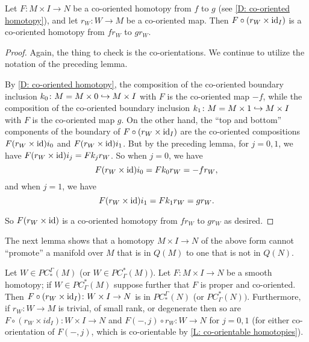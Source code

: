 \begin{corollary}\label{C: universal homotopy boundary co-orientation}
	Let $F \colon M \times I \to N$ be a co-oriented homotopy from $f$ to $g$ (see \cref{D: co-oriented homotopy}), and let $r_W \colon W \to M$ be a co-oriented map.
	Then $F \circ (r_W \times \mathrm{id}_I)$ is a co-oriented homotopy from $fr_W$ to $gr_W$.
\end{corollary}

\begin{proof}
	Again, the thing to check is the co-orientations. We continue to utilize the notation of the preceding lemma.

	By \cref{D: co-oriented homotopy}, the composition of the co-oriented boundary inclusion $k_0 \colon M = M \times 0 \hookrightarrow M \times I$ with $F$ is the co-oriented map $-f$, while the composition of the co-oriented boundary inclusion $k_1 \colon M = M \times 1 \hookrightarrow M \times I$ with $F$ is the co-oriented map
	$g$. On the other hand, the ``top and bottom'' components of the boundary of $F \circ (r_W \times \mathrm{id}_I)$ are the co-oriented compositions $F (r_W\times \mathrm{id}) i_0$ and $F (r_W\times \mathrm{id}) i_1$.
	But by the preceding lemma, for $j=0,1$, we have $F (r_W\times \mathrm{id}) i_j = F k_j r_W$.
	So when $j=0$, we have
	$$ F (r_W\times \mathrm{id}) i_0 = F k_0 r_W = -f r_W,$$
	and when $j=1$, we have
	$$ F (r_W\times \mathrm{id}) i_1 = F k_1 r_W = g r_W.$$

	So $F (r_W\times \mathrm{id})$ is a co-oriented homotopy from $fr_W$ to $gr_W$ as desired.
\end{proof}

The next lemma shows that a homotopy $M \times I \to N$ of the above form cannot ``promote'' a manifold over $M$ that is in $Q(M)$ to one that is not in $Q(N)$.

\begin{lemma}\label{L: dessicated homotopy}
	Let $W \in PC_*^\Gamma(M)$ (or $W \in PC^*_\Gamma(M)$).
	Let $F \colon M \times I \to N$ be a smooth homotopy; if $W \in PC^*_\Gamma(M)$ suppose further that $F$ is proper and co-oriented.
	Then $F \circ (r_W \times \mathrm{id}_I) \colon W \times I \to N$ is in $PC_*^\Gamma(N)$ (or $PC^*_\Gamma(N))$.
	Furthermore,
	if $r_W \colon W \to M$ is trivial, of small rank, or degenerate then so are
	$F \circ (r_W \times id_I) \colon W \times I \to N$ and $F(-,j) \circ r_W \colon W \to N$ for $j=0,1$ (for either co-orientation of $F(-,j)$, which is co-orientable by \cref{L: co-orientable homotopies}).
\end{lemma}

